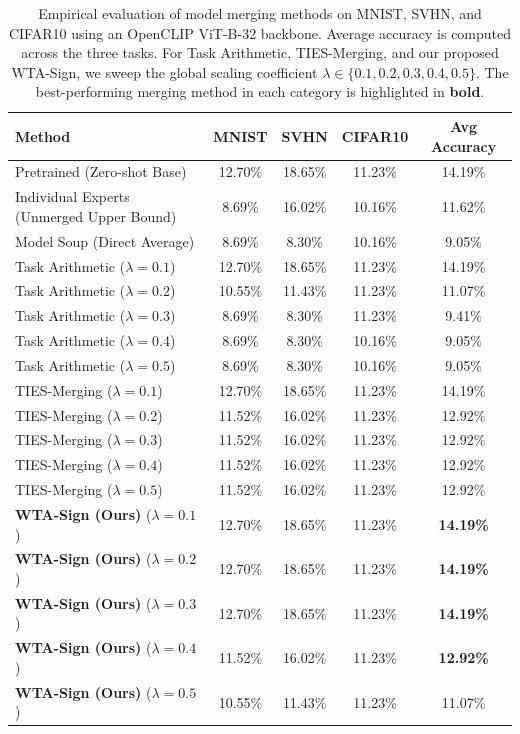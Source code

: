 \begin{table}[t]
\caption{Empirical evaluation of model merging methods on \mbox{MNIST}, \mbox{SVHN}, and \mbox{CIFAR10} using an OpenCLIP \mbox{ViT-B-32} backbone. Average accuracy is computed across the three tasks. For Task Arithmetic, \mbox{TIES-Merging}, and our proposed WTA-Sign, we sweep the global scaling coefficient $\lambda \in \{0.1, 0.2, 0.3, 0.4, 0.5\}$. The best-performing merging method in each category is highlighted in \textbf{bold}.}
\label{tab:main_results}
\vskip 0.15in
\begin{center}
\begin{small}
\begin{sc}
\begin{tabular}{lcccc}
\toprule
Method & MNIST & SVHN & CIFAR10 & Avg Accuracy \\
\midrule
Pretrained (Zero-shot Base) & 12.70\% & 18.65\% & 11.23\% & 14.19\% \\
Individual Experts (Unmerged Upper Bound) & 8.69\% & 16.02\% & 10.16\% & 11.62\% \\
Model Soup (Direct Average) & 8.69\% & 8.30\% & 10.16\% & 9.05\% \\
\midrule
Task Arithmetic ($\lambda=0.1$) & 12.70\% & 18.65\% & 11.23\% & 14.19\% \\
Task Arithmetic ($\lambda=0.2$) & 10.55\% & 11.43\% & 11.23\% & 11.07\% \\
Task Arithmetic ($\lambda=0.3$) & 8.69\% & 8.30\% & 11.23\% & 9.41\% \\
Task Arithmetic ($\lambda=0.4$) & 8.69\% & 8.30\% & 10.16\% & 9.05\% \\
Task Arithmetic ($\lambda=0.5$) & 8.69\% & 8.30\% & 10.16\% & 9.05\% \\
\midrule
TIES-Merging ($\lambda=0.1$) & 12.70\% & 18.65\% & 11.23\% & 14.19\% \\
TIES-Merging ($\lambda=0.2$) & 11.52\% & 16.02\% & 11.23\% & 12.92\% \\
TIES-Merging ($\lambda=0.3$) & 11.52\% & 16.02\% & 11.23\% & 12.92\% \\
TIES-Merging ($\lambda=0.4$) & 11.52\% & 16.02\% & 11.23\% & 12.92\% \\
TIES-Merging ($\lambda=0.5$) & 11.52\% & 16.02\% & 11.23\% & 12.92\% \\
\midrule
\textbf{WTA-Sign (Ours)} ($\lambda=0.1$) & 12.70\% & 18.65\% & 11.23\% & \textbf{14.19\%} \\
\textbf{WTA-Sign (Ours)} ($\lambda=0.2$) & 12.70\% & 18.65\% & 11.23\% & \textbf{14.19\%} \\
\textbf{WTA-Sign (Ours)} ($\lambda=0.3$) & 12.70\% & 18.65\% & 11.23\% & \textbf{14.19\%} \\
\textbf{WTA-Sign (Ours)} ($\lambda=0.4$) & 11.52\% & 16.02\% & 11.23\% & \textbf{12.92\%} \\
\textbf{WTA-Sign (Ours)} ($\lambda=0.5$) & 10.55\% & 11.43\% & 11.23\% & 11.07\% \\
\bottomrule
\end{tabular}
\end{sc}
\end{small}
\end{center}
\vskip -0.1in
\end{table}

